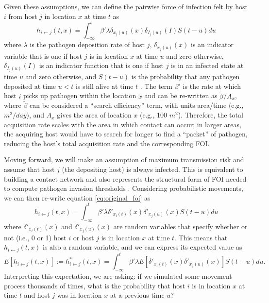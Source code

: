 \documentclass[letterpaper]{article}
\begin{document}
Given these assumptions, we can define the pairwise force of infection felt by host $i$ from host $j$ in location $x$ at time $t$ as \citep{Wilber2022}
\begin{equation}
    h_{i \leftarrow j}(t, x) = \int_{-\infty}^{t} \beta' \lambda \delta_{x_j(u)}(x) \delta_{I_j(u)}(I) S(t - u) du
    \label{eq:original_foi}
\end{equation}
where $\lambda$ is the pathogen deposition rate of host $j$, $\delta_{x_j(u)}(x)$ is an indicator variable that is one if host $j$ is in location $x$ at time $u$ and zero otherwise, $\delta_{I_j(u)}(I)$ is an indicator function that is one if host $j$ is in an infected state at time $u$ and zero otherwise, and $S(t-u)$ is the probability that any pathogen deposited at time $u < t$ is still alive at time $t$ \citep[see][for a full derivation]{Wilber2022}.  
The term $\beta'$ is the rate at which host $i$ picks up pathogen within the location $x$ and can be re-written as $\tilde{\beta} / A_x$, where $\tilde{\beta}$ can be considered a ``search efficiency'' term, with units area/time (e.g., $m^2 / day$), and $A_x$ gives the area of location $x$ (e.g., 100 $m^2$). 
Therefore, the total acquisition rate scales with the area in which contact can occur; in larger areas, the acquiring host would have to search for longer to find a ``packet'' of pathogen, reducing the host's total acquisition rate and the corresponding FOI. 

Moving forward, we will make an assumption of maximum transmission risk and assume that host $j$ (the depositing host) is always infected. 
This is equivalent to building a contact network and also represents the structural form of FOI needed to compute pathogen invasion thresholds \citep{Wilber2022}.
Considering probabilistic movements, we can then re-write equation \ref{eq:original_foi} as
\begin{equation}
    h_{i \leftarrow j}(t, x) = \int_{-\infty}^{t} \beta' \lambda \delta'_{x_i(t)}(x) \delta'_{x_j(u)}(x) S(t - u) du
    \label{eq:prob_foi}
\end{equation}
where $\delta'_{x_i(t)}(x)$ and $\delta'_{x_j(u)}(x)$ are random variables that specify whether or not (i.e., 0 or 1) host $i$ or host $j$ is in location $x$ at time $t$.  This means that $h_{i \leftarrow j}(t, x)$ is also a random variable, and we can express its expected value as 
\begin{equation}
    E[h_{i \leftarrow j}(t, x)] := h^*_{i \leftarrow j}(t, x) = \int_{-\infty}^{t} \beta' \lambda E[\delta'_{x_i(t)}(x) \delta'_{x_j(u)}(x)] S(t - u) du.
    \label{eq:expected_foi}
\end{equation}
Interpreting this expectation, we are asking: if we simulated some movement process thousands of times, what is the probability that host $i$ is in location $x$ at time $t$ and host $j$ was in location $x$ at a previous time $u$? 
\end{document}
